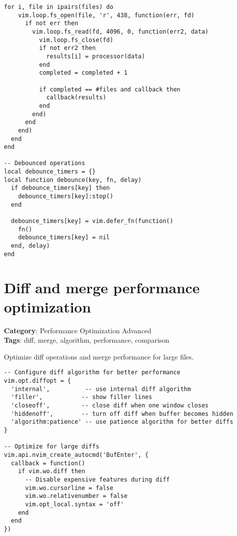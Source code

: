{{{{{{{{{\begin{Exa*}{}
\begin{Verbatim}[fontsize=\footnotesize, breaklines, breakanywhere]
  for i, file in ipairs(files) do
    vim.loop.fs_open(file, 'r', 438, function(err, fd)
      if not err then
        vim.loop.fs_read(fd, 4096, 0, function(err2, data)
          vim.loop.fs_close(fd)
          if not err2 then
            results[i] = processor(data)
          end
          completed = completed + 1
          
          if completed == #files and callback then
            callback(results)
          end
        end)
      end
    end)
  end
end

-- Debounced operations
local debounce_timers = {}
local function debounce(key, fn, delay)
  if debounce_timers[key] then
    debounce_timers[key]:stop()
  end
  
  debounce_timers[key] = vim.defer_fn(function()
    fn()
    debounce_timers[key] = nil
  end, delay)
end
\end{Verbatim}
\end{Exa*}

\section{Diff and merge performance optimization}

\textbf{Category}: Performance Optimization Advanced\\ \textbf{Tags}: diff, merge, algorithm, performance, comparison
\vspace{0.5cm}

Optimize diff operations and merge performance for large files.

\begin{Exa*}{}
\begin{Verbatim}[fontsize=\footnotesize, breaklines, breakanywhere]
-- Configure diff algorithm for better performance
vim.opt.diffopt = {
  'internal',          -- use internal diff algorithm
  'filler',           -- show filler lines
  'closeoff',         -- close diff when one window closes
  'hiddenoff',        -- turn off diff when buffer becomes hidden
  'algorithm:patience' -- use patience algorithm for better diffs
}

-- Optimize for large diffs
vim.api.nvim_create_autocmd('BufEnter', {
  callback = function()
    if vim.wo.diff then
      -- Disable expensive features during diff
      vim.wo.cursorline = false
      vim.wo.relativenumber = false
      vim.opt_local.syntax = 'off'
    end
  end
})
\end{Verbatim}
\end{Exa*}

}}}}}}}}}
